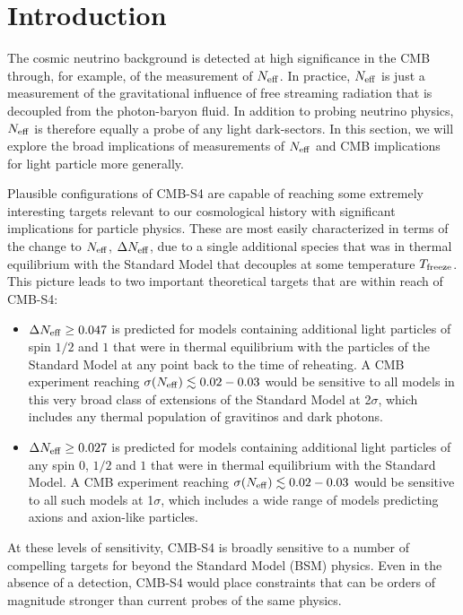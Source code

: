 \section{Introduction}



The cosmic neutrino background is detected at high significance in the CMB through, for example, of the measurement of $N_{\rm eff}$.  In practice, $N_{\rm eff}$ is just a measurement of the gravitational influence of free streaming radiation that is decoupled from the photon-baryon fluid.  In addition to probing neutrino physics, $N_{\rm eff}$ is therefore equally a probe of any light dark-sectors.  In this section, we will explore the broad implications of measurements of $N_{\rm eff}$ and CMB implications for light particle more generally.

Plausible configurations of CMB-S4 are capable of reaching some extremely interesting targets relevant to our cosmological history with significant implications for particle physics. These are most easily characterized in terms of the change to $N_{\rm eff}$, $\Delta N_{\rm eff}$, due to a single additional species that was in thermal equilibrium with the Standard Model that decouples at some temperature $T_{\rm freeze}$.  This picture leads to two important theoretical targets that are within reach of CMB-S4:
\begin{itemize}
\item $\Delta N_{\rm eff} \geq 0.047$ is predicted for models containing additional light particles of spin $1/2$ and $1$ that were in thermal equilibrium with the particles of the Standard Model at any point back to the time of reheating.  A CMB experiment reaching $\sigma(N_{\rm eff}) \lesssim 0.02-0.03$ would be sensitive to all models in this very broad class of extensions of the Standard Model at 2$\sigma$, which includes any thermal population of gravitinos and dark photons.  %
\item $\Delta N_{\rm eff} \geq  0.027$ is predicted for models containing additional light particles of any spin $0$, $1/2$ and $1$ that were in thermal equilibrium with the Standard Model.  A CMB experiment reaching $\sigma(N_{\rm eff}) \lesssim 0.02-0.03$ would be sensitive to all such models at 1$\sigma$, which includes a wide range of models predicting axions and axion-like particles. 
\end{itemize}
At these levels of sensitivity, CMB-S4 is broadly sensitive to a number of compelling targets for beyond the Standard Model (BSM) physics.  Even in the absence of a detection, CMB-S4 would place constraints that can be orders of magnitude stronger than current probes of the same physics.


